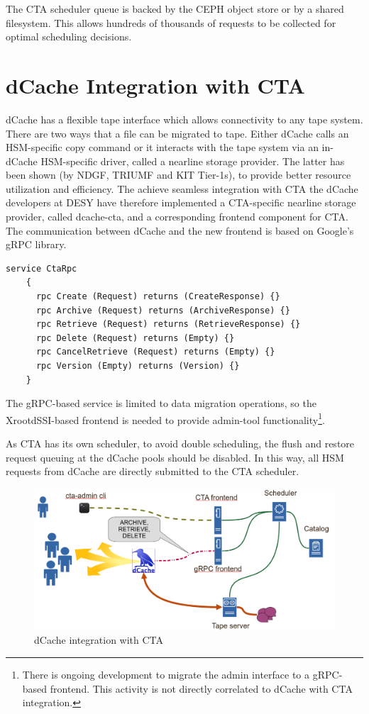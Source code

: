 \documentclass{webofc}
\begin{document}
The CTA scheduler queue is backed by the CEPH\cite{ceph} object store or by a shared filesystem. This allows hundreds of thousands of requests to be collected for optimal scheduling decisions.

\section{dCache Integration with CTA}
\label{sec:integration}

dCache has a flexible tape interface which allows connectivity to any tape system. There are two ways that a file can be migrated to tape. Either dCache calls an HSM-specific copy command or it interacts with the tape system via an in-dCache HSM-specific driver, called a nearline storage provider. The latter has been shown (by NDGF, TRIUMF and KIT Tier-1s), to provide better resource utilization and efficiency\cite{endit_kit}. The achieve seamless integration with CTA the dCache developers at DESY have therefore implemented a CTA-specific nearline storage provider, called dcache-cta\cite{dcache_cta}, and a corresponding frontend component for CTA. The communication between dCache and the new frontend is based on Google’s gRPC library.
\newpagex
\begin{lstlisting}[label=grpc-frontend,caption={gRPC service definition},keywords={service,rpc,returns}]
    service CtaRpc
    {
      rpc Create (Request) returns (CreateResponse) {}
      rpc Archive (Request) returns (ArchiveResponse) {}
      rpc Retrieve (Request) returns (RetrieveResponse) {}
      rpc Delete (Request) returns (Empty) {}
      rpc CancelRetrieve (Request) returns (Empty) {}
      rpc Version (Empty) returns (Version) {}
    }
\end{lstlisting}

The gRPC-based service is limited to data migration operations, so the XrootdSSI-based frontend is needed to provide admin-tool functionality\footnote{There is ongoing development to migrate the admin interface to a gRPC-based\cite{grpc} frontend. This activity is not directly correlated to dCache with CTA integration.}.

As CTA has its own scheduler, to avoid double scheduling,  the flush and restore request queuing at the dCache pools should be disabled. In this way, all HSM requests from dCache are directly submitted to the CTA scheduler.

\begin{figure}[h]
    \centering
    \includegraphics[scale=0.25]{dcache+cta.png}
    \caption{dCache integration with CTA}
    \label{fig:dcache_integration}
\end{figure}
\end{document}

